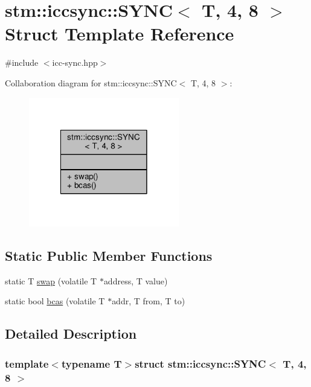 \hypertarget{structstm_1_1iccsync_1_1SYNC_3_01T_00_014_00_018_01_4}{\section{stm\-:\-:iccsync\-:\-:S\-Y\-N\-C$<$ T, 4, 8 $>$ Struct Template Reference}
\label{structstm_1_1iccsync_1_1SYNC_3_01T_00_014_00_018_01_4}
}


{\ttfamily \#include $<$icc-\/sync.\-hpp$>$}



Collaboration diagram for stm\-:\-:iccsync\-:\-:S\-Y\-N\-C$<$ T, 4, 8 $>$\-:
\nopagebreak
\begin{figure}[H]
\begin{center}
\leavevmode
\includegraphics[width=186pt]{structstm_1_1iccsync_1_1SYNC_3_01T_00_014_00_018_01_4__coll__graph}
\end{center}
\end{figure}
\subsection*{Static Public Member Functions}
\begin{DoxyCompactItemize}
\item 
static T \hyperlink{structstm_1_1iccsync_1_1SYNC_3_01T_00_014_00_018_01_4_a0115b7fe10b656f00b21f0ffc0e9fc9b}{swap} (volatile T $\ast$address, T value)
\item 
static bool \hyperlink{structstm_1_1iccsync_1_1SYNC_3_01T_00_014_00_018_01_4_a7a9df68da32874b83e6b7574abb0f769}{bcas} (volatile T $\ast$addr, T from, T to)
\end{DoxyCompactItemize}


\subsection{Detailed Description}
\subsubsection*{template$<$typename T$>$struct stm\-::iccsync\-::\-S\-Y\-N\-C$<$ T, 4, 8 $>$}

